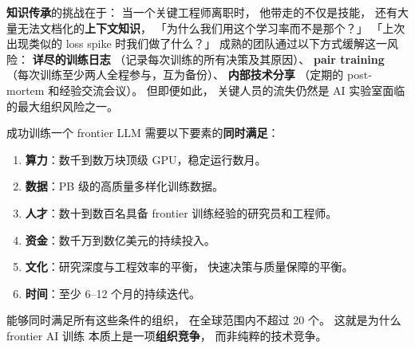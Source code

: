 \textbf{知识传承}的挑战在于：
当一个关键工程师离职时，
他带走的不仅是技能，
还有大量无法文档化的\textbf{上下文知识}，
「为什么我们用这个学习率而不是那个？」
「上次出现类似的 loss spike 时我们做了什么？」
成熟的团队通过以下方式缓解这一风险：
\textbf{详尽的训练日志}
（记录每次训练的所有决策及其原因）、
\textbf{pair training}
（每次训练至少两人全程参与，互为备份）、
\textbf{内部技术分享}
（定期的 post-mortem 和经验交流会议）。
但即便如此，
关键人员的流失仍然是
AI 实验室面临的最大组织风险之一。

\begin{corebox}
成功训练一个 frontier LLM 需要以下要素的\textbf{同时满足}：
\begin{enumerate}[noitemsep]
  \item \textbf{算力}：数千到数万块顶级 GPU，稳定运行数月。
  \item \textbf{数据}：PB 级的高质量多样化训练数据。
  \item \textbf{人才}：数十到数百名具备
        frontier 训练经验的研究员和工程师。
  \item \textbf{资金}：数千万到数亿美元的持续投入。
  \item \textbf{文化}：研究深度与工程效率的平衡，
        快速决策与质量保障的平衡。
  \item \textbf{时间}：至少 6--12 个月的持续迭代。
\end{enumerate}
能够同时满足所有这些条件的组织，
在全球范围内不超过 20 个。
这就是为什么 frontier AI 训练
本质上是一项\textbf{组织竞争}，
而非纯粹的技术竞争。
\end{corebox}


